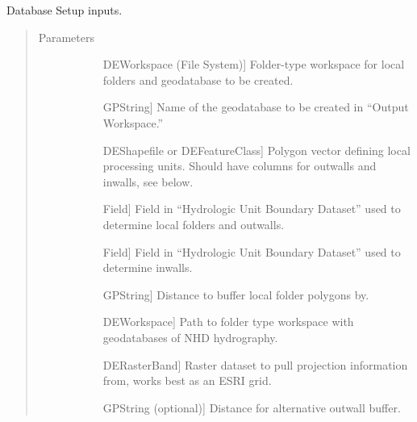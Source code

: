 \documentclass[letterpaper,10pt,english]{sphinxmanual}
\begin{document}
\begin{fulllineitems}
\begin{fulllineitems}
\label{\detokenize{StreamStats_DataPrep:StreamStats_DataPrep.databaseSetup.getParameterInfo}}
Database Setup inputs.
\begin{quote}\begin{description}
\item[{Parameters}] \leavevmode\begin{description}
\item[{}] \leavevmode{[}DEWorkspace (File System){]}
Folder-type workspace for local folders and geodatabase to be created.

\item[{}] \leavevmode{[}GPString{]}
Name of the geodatabase to be created in “Output Workspace.”

\item[{}] \leavevmode{[}DEShapefile or DEFeatureClass{]}
Polygon vector defining local processing units. Should have columns for outwalls and inwalls, see below.

\item[{}] \leavevmode{[}Field{]}
Field in “Hydrologic Unit Boundary Dataset” used to determine local folders and outwalls.

\item[{}] \leavevmode{[}Field{]}
Field in “Hydrologic Unit Boundary Dataset” used to determine inwalls.

\item[{}] \leavevmode{[}GPString{]}
Distance to buffer local folder polygons by.

\item[{}] \leavevmode{[}DEWorkspace{]}
Path to folder type workspace with geodatabases of NHD hydrography.

\item[{}] \leavevmode{[}DERasterBand{]}
Raster dataset to pull projection information from, works best as an ESRI grid.

\item[{}] \leavevmode{[}GPString (optional){]}
Distance for alternative outwall buffer.


\end{description}
\end{description}
\end{quote}
\end{fulllineitems}
\end{fulllineitems}
\end{document}
